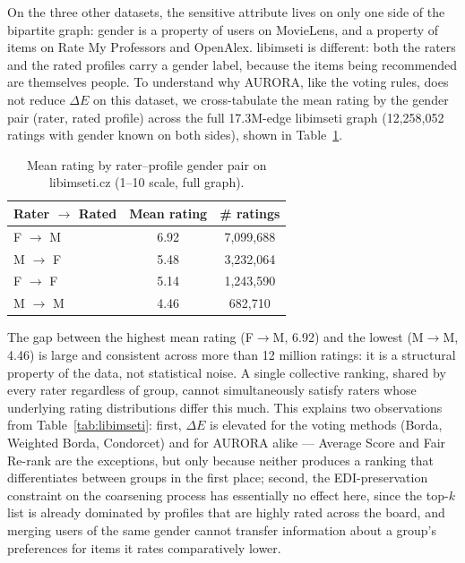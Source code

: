 \documentclass[a4paper,fleqn]{cas-dc}
\begin{document}
On the three other datasets, the sensitive attribute lives on only one side
of the bipartite graph: gender is a property of users on MovieLens, and a
property of items on Rate My Professors and OpenAlex. libimseti is
different: both the raters and the rated profiles carry a gender label,
because the items being recommended are themselves people. To understand
why AURORA, like the voting rules, does not reduce $\Delta E$ on this
dataset, we cross-tabulate the mean rating by the gender pair (rater,
rated profile) across the full 17.3M-edge libimseti graph (12{,}258{,}052
ratings with gender known on both sides), shown in
Table~\ref{tab:libimseti-crosstab}.

\begin{table}[h!]
\caption{Mean rating by rater--profile gender pair on libimseti.cz
(1--10 scale, full graph).}
\label{tab:libimseti-crosstab}
\centering
\begin{tabular}{lcc}
\hline
Rater $\to$ Rated & Mean rating & \# ratings \\
\hline
F $\to$ M & 6.92 & 7{,}099{,}688 \\
M $\to$ F & 5.48 & 3{,}232{,}064 \\
F $\to$ F & 5.14 & 1{,}243{,}590 \\
M $\to$ M & 4.46 &   682{,}710 \\
\hline
\end{tabular}
\end{table}

The gap between the highest mean rating (F$\to$M, 6.92) and the lowest
(M$\to$M, 4.46) is large and consistent across more than 12 million
ratings: it is a structural property of the data, not statistical noise.
A single collective ranking, shared by every rater regardless of group,
cannot simultaneously satisfy raters whose underlying rating distributions
differ this much. This explains two observations from
Table~\ref{tab:libimseti}: first, $\Delta E$ is elevated for the voting
methods (Borda, Weighted Borda, Condorcet) and for AURORA alike — Average
Score and Fair Re-rank are the exceptions, but only because neither
produces a ranking that differentiates between groups in the first place;
second, the EDI-preservation constraint on the coarsening process has
essentially no effect here, since the top-$k$ list is already dominated by
profiles that are highly rated across the board, and merging users of the
same gender cannot transfer information about a group's preferences for
items it rates comparatively lower.
\end{document}

